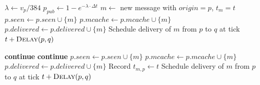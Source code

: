 \documentclass{article}
\begin{document}
\begin{algorithm}[H]
\caption{Message Production}
\label{alg:produce}
\begin{algorithmic}[1]
    \State $\lambda \gets v_p / 384$ 
    \State $p_{\mathit{pub}} \gets 1 - e^{-\lambda \cdot \Delta t}$ 
        \State $m \gets$ new message with $\mathit{origin}=p$, $t_m=t$
        \State $p.\mathit{seen} \gets p.\mathit{seen} \cup \{m\}$
        \State $p.\mathit{mcache} \gets p.\mathit{mcache} \cup \{m\}$
        \State $p.\mathit{delivered} \gets p.\mathit{delivered} \cup \{m\}$
         
                \State Schedule delivery of $m$ from $p$ to $q$ at tick $t + \Call{Delay}{p, q}$
            \EndIf
        \EndFor
    \EndIf
\EndFor
\EndProcedure
\end{algorithmic}
\end{algorithm}


\begin{algorithm}[H]
\caption{Process Scheduled Deliveries}
\label{alg:deliver}
\begin{algorithmic}[1]
        \State \textbf{continue} 
    \EndIf
        \State \textbf{continue} 
    \EndIf
    \State $p.\mathit{seen} \gets p.\mathit{seen} \cup \{m\}$
    \State $p.\mathit{mcache} \gets p.\mathit{mcache} \cup \{m\}$
    \State $p.\mathit{delivered} \gets p.\mathit{delivered} \cup \{m\}$ 
    \State Record $t_{m,p} \gets t$ 
     
            \State Schedule delivery of $m$ from $p$ to $q$ at tick $t + \Call{Delay}{p, q}$
        \EndIf
    \EndFor
\EndFor
\EndProcedure
\end{algorithmic}
\end{algorithm}

\end{document}
